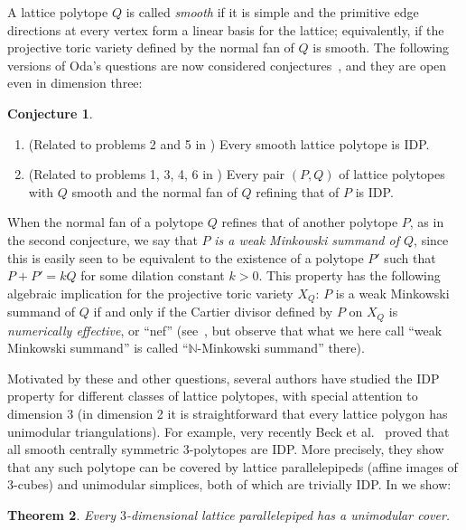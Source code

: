 \documentclass{amsart}
\theoremstyle{plain}
\newtheorem{theorem}{Theorem}[section]
\theoremstyle{definition}
\newtheorem{conjecture}[theorem]{Conjecture}
\newcommand{\N}{ \ensuremath{\mathbb{N}}}
\begin{document}
A lattice polytope $Q$ is called \emph{smooth} if it is simple and the primitive edge directions at every vertex form a linear basis for the lattice; equivalently, if the projective toric variety defined by the normal fan of $Q$ is smooth. 
The following versions of Oda's questions are now considered conjectures~\cite{HNPS2008,mfo2007}, and they are open even in dimension three:
\begin{conjecture}
\label{conj:Oda}
\begin{enumerate}
\item 
\label{itm:smoothIDP}
(Related to problems 2 and 5 in \cite{Oda1997})
Every smooth lattice polytope is IDP.
\item 
\label{itm:mixedIDP}
(Related to problems 1, 3, 4, 6 in \cite{Oda1997}) Every pair $(P,Q)$ of lattice polytopes with $Q$ smooth and the normal fan of $Q$ refining that of $P$ is IDP.
\end{enumerate}
\end{conjecture}

When the normal fan of a polytope $Q$ refines that of another polytope $P$, as in the second conjecture, we say that $P$ \emph{is a weak Minkowski summand of $Q$}, since this is easily seen to be equivalent to the existence of a polytope $P'$ such that $P+P' = k Q$ for some dilation constant $k>0$. 
This property has the following algebraic implication for the projective toric variety $X_Q$: $P$ is a weak Minkowski summand of $Q$ if and only if the Cartier divisor defined by $P$ on  $X_Q$ is \emph{numerically effective}, or ``nef'' (see~\cite[Cor.~6.2.15, Thm.~6.3.12]{CLS}, but observe that what we here call  ``weak Minkowski summand'' is called ``$\N$-Minkowski summand'' there). 


\medskip 
Motivated by these and other questions, several authors have studied the IDP property for different classes of lattice polytopes,
with special attention to dimension $3$ (in dimension 2 it is straightforward that every lattice polygon has unimodular triangulations). 
%
For example,  very recently
Beck et al.~\cite{BHHHJKM2019} proved that all smooth centrally symmetric $3$-polytopes are IDP.
More precisely, they show that any such polytope can be covered by lattice 
parallelepipeds (affine images of $3$-cubes) and unimodular simplices, both of which are trivially IDP.
%
In  we show:

\begin{theorem}
\label{thm:parallelepipeds}
Every $3$-dimensional lattice parallelepiped has a unimodular cover.
\end{theorem}
\end{document}
